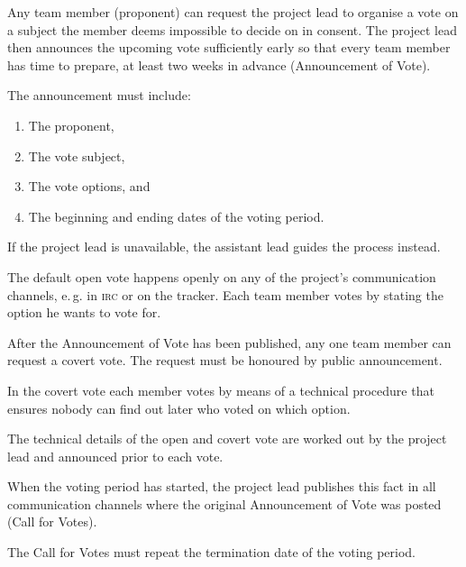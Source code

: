 \documentclass[10pt,a4paper,DIV=calc,headings=medium,twocolumn,draft]{scrartcl}
\newcommand\irc{\textsc{irc}\xspace}
\newcommand\eg{e.\,g.\xspace}
\begin{document}
\begin{contract}


  Any team member (proponent) can request the project lead to organise
  a vote on a subject the member deems impossible to decide on in
  consent. The project lead then announces the upcoming vote
  sufficiently early so that every team member has time to prepare, at
  least two weeks in advance (Announcement of Vote).

  The announcement must include:

  \begin{enumerate}
  \item The proponent,
  \item The vote subject,
  \item The vote options, and
  \item The beginning and ending dates of the voting period.
  \end{enumerate}

  If the project lead is unavailable, the assistant lead guides the
  process instead.


  The default open vote happens openly on any of the project’s
  communication channels, \eg in \irc or on the tracker. Each team
  member votes by stating the option he wants to vote for.


  After the Announcement of Vote has been published, any one team
  member can request a covert vote. The request must be honoured by
  public announcement.

  In the covert vote each member votes by means of a technical
  procedure that ensures nobody can find out later who voted on which
  option.


  The technical details of the open and covert vote are worked out by
  the project lead and announced prior to each vote.


  When the voting period has started, the project lead publishes this
  fact in all communication channels where the original Announcement
  of Vote was posted (Call for Votes).

  The Call for Votes must repeat the termination date of the voting
  period.


\end{contract}
\end{document}
